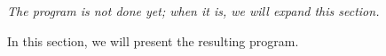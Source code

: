 \textit{The program is not done yet; when it is, we will expand this section.}

In this section, we will present the resulting program.